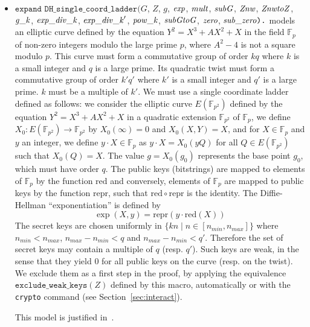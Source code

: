 \documentclass{article}
\begin{document}
\begin{itemize}
\begin{itemize}
\begin{itemize}
\newcommand{\F}{\mathbb{F}}%
\newcommand{\red}{\mathrm{red}}%
\newcommand{\repr}{\mathrm{repr}}%
\newcommand{\modop}{\mathbin{\mathrm{mod}}}%
\newcommand{\mul}[2]{{#1}\cdot{#2}}

     \item $\texttt{expand\ DH\_single\_coord\_ladder}(G$, $Z$, $g$, $\mathit{exp}$, $\mathit{mult}$, $\mathit{subG}$, $\mathit{Znw}$, $\mathit{ZnwtoZ}$, $\mathit{g\_k}$, $\mathit{exp\_div\_k}$, $\mathit{exp\_div\_k}'$, $\mathit{pow\_k}$, $\mathit{subGtoG}$, $\mathit{zero}$, $\mathit{sub\_zero}\texttt{).}$ models an elliptic curve defined by the equation
   $Y^2 = X^3 + A X^2 + X$ in the field $\F_p$ of non-zero integers modulo the 
   large prime $p$, where $A^2 - 4$ is not a square modulo $p$.
   This curve must form a commutative group of order $kq$ where $k$ is a 
   small integer and $q$ is a large prime.
   Its quadratic twist must form a commutative group of order $k'q'$ where $k'$
   is a small integer and $q'$ is a large prime.
   $k$ must be a multiple of $k'$.
   We must use a single coordinate ladder defined as follows: we
   consider the elliptic curve $E(\F_{p^2})$ defined by the equation $Y^2 =
   X^3 + A X^2 + X$ in a quadratic extension $\F_{p^2}$ of $\F_p$, we define 
   $X_0 : E(\F_{p^2}) \rightarrow \F_{p^2}$ by $X_0(\infty) = 0$ and $X_0(X,Y) = X$, and 
   for $X \in \F_p$ and $y$ an integer, we define $\mul{y}{X} \in \F_p$ as $\mul{y}{X} = X_0(yQ)$
   for all $Q \in E(\F_{p^2})$ such that $X_0(Q) = X$.
   The value $g = X_0(g_0)$ represents the base point $g_0$, which must have order $q$.
   The public keys (bitstrings) are mapped to elements of $\F_p$ by the function 
   $\red$ and conversely, elements of $\F_p$ are mapped to public keys by
   the function $\repr$, such that $\red \circ \repr$ is the identity.
   The Diffie-Hellman ``exponentiation'' is defined by 
      \[\exp(X,y) = \repr(\mul{y}{\red(X)})\]
   The secret keys are chosen uniformly in $\{ kn \mid n \in [n_{min},n_{max}] \}$
   where $n_{min} < n_{max}$, $n_{max} - n_{min} < q$ and $n_{max} - n_{min} < q'$.
   Therefore the set of secret keys may contain a multiple of $q$ (resp. $q'$).
   Such keys are weak, in the sense that they yield 0 for all public
   keys on the curve (resp. on the twist). We exclude them as a first step
   in the proof, by applying the equivalence $\texttt{exclude\_weak\_keys}(Z)$
   defined by this macro, automatically or with the
   \texttt{crypto} command (see Section~\ref{sec:interact}).

This model is justified in~\cite{LippBlanchetBharagavanInria19}.


\end{itemize}
\end{itemize}
\end{itemize}
\end{document}
